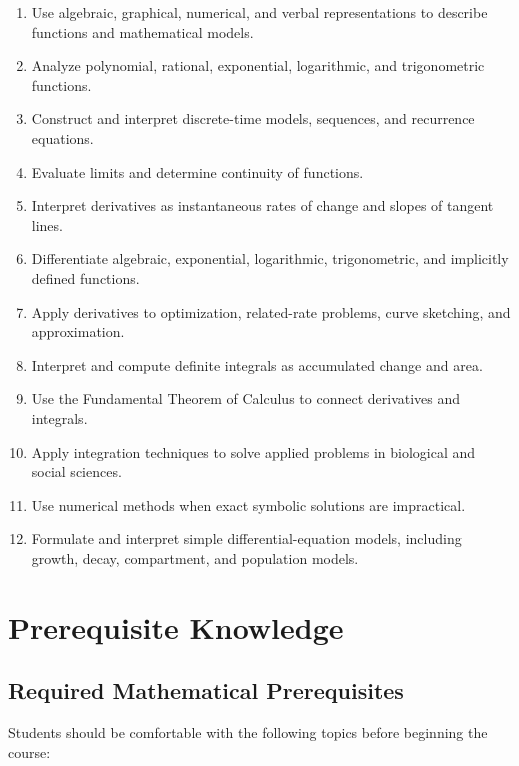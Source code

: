 \documentclass[11pt]{article}
\begin{document}
\begin{enumerate}[label=\arabic*.]
    \item Use algebraic, graphical, numerical, and verbal representations to describe functions and mathematical models.
    \item Analyze polynomial, rational, exponential, logarithmic, and trigonometric functions.
    \item Construct and interpret discrete-time models, sequences, and recurrence equations.
    \item Evaluate limits and determine continuity of functions.
    \item Interpret derivatives as instantaneous rates of change and slopes of tangent lines.
    \item Differentiate algebraic, exponential, logarithmic, trigonometric, and implicitly defined functions.
    \item Apply derivatives to optimization, related-rate problems, curve sketching, and approximation.
    \item Interpret and compute definite integrals as accumulated change and area.
    \item Use the Fundamental Theorem of Calculus to connect derivatives and integrals.
    \item Apply integration techniques to solve applied problems in biological and social sciences.
    \item Use numerical methods when exact symbolic solutions are impractical.
    \item Formulate and interpret simple differential-equation models, including growth, decay, compartment, and population models.
\end{enumerate}

\section{Prerequisite Knowledge}

\subsection{Required Mathematical Prerequisites}

Students should be comfortable with the following topics before beginning the course:
\end{document}
